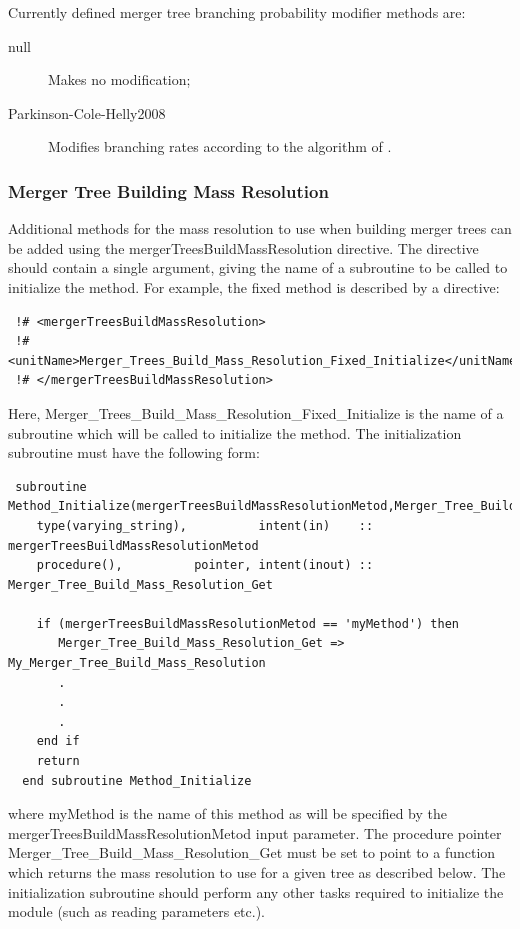Currently defined merger tree branching probability modifier methods are:
\begin{description}
 \item [{\normalfont \ttfamily null}] Makes no modification;
 \item [{\normalfont \ttfamily Parkinson-Cole-Helly2008}] Modifies branching rates according to the algorithm of \cite{parkinson_generating_2008}.
\end{description}

\subsubsection{Merger Tree Building Mass Resolution}\label{sec:MergerTreeBuildMethodMassResolution}

Additional methods for the mass resolution to use when building merger trees can be added using the {\normalfont \ttfamily mergerTreesBuildMassResolution} directive. The directive should contain a single argument, giving the name of a subroutine to be called to initialize the method. For example, the {\normalfont \ttfamily fixed} method is described by a directive:
\begin{verbatim}
 !# <mergerTreesBuildMassResolution>
 !#  <unitName>Merger_Trees_Build_Mass_Resolution_Fixed_Initialize</unitName>
 !# </mergerTreesBuildMassResolution>
\end{verbatim}
Here, {\normalfont \ttfamily Merger\_Trees\_Build\_Mass\_Resolution\_Fixed\_Initialize} is the name of a subroutine which will be called to initialize the method. The initialization subroutine must have the following form:
\begin{verbatim}
 subroutine Method_Initialize(mergerTreesBuildMassResolutionMetod,Merger_Tree_Build_Mass_Resolution_Get)
    type(varying_string),          intent(in)    :: mergerTreesBuildMassResolutionMetod
    procedure(),          pointer, intent(inout) :: Merger_Tree_Build_Mass_Resolution_Get
    
    if (mergerTreesBuildMassResolutionMetod == 'myMethod') then
       Merger_Tree_Build_Mass_Resolution_Get => My_Merger_Tree_Build_Mass_Resolution
       .
       .
       .
    end if
    return
  end subroutine Method_Initialize
\end{verbatim}
where {\normalfont \ttfamily myMethod} is the name of this method as will be specified by the {\normalfont \ttfamily mergerTreesBuildMassResolutionMetod} input parameter. The procedure pointer {\normalfont \ttfamily Merger\_Tree\_Build\_Mass\_Resolution\_Get} must be set to point to a function which returns the mass resolution to use for a given tree as described below. The initialization subroutine should perform any other tasks required to initialize the module (such as reading parameters etc.).

